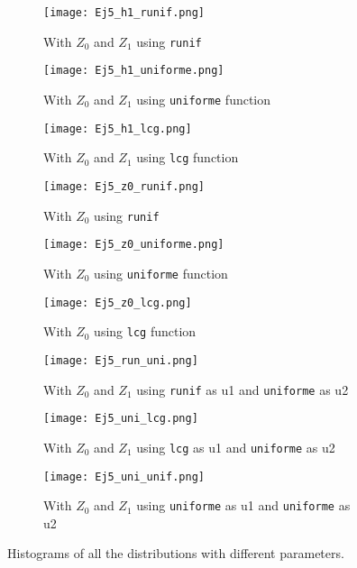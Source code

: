 \documentclass{article}
\begin{document}
\begin{figure}[]
\begin{subfigure}{.33\textwidth}
  \centering
  \texttt{[image: Ej5\_h1\_runif.png]}  
  \caption{With $Z_0$ and $Z_1$ using \texttt{runif}}
  \label{subfig5-1}
\end{subfigure}
\begin{subfigure}{.33\textwidth}
  \centering
  \texttt{[image: Ej5\_h1\_uniforme.png]}  
  \caption{With $Z_0$ and $Z_1$ using \texttt{uniforme} function}
  \label{subfig5-2}
\end{subfigure}
\begin{subfigure}{.33\textwidth}
  \centering
  \texttt{[image: Ej5\_h1\_lcg.png]}  
  \caption{ With $Z_0$ and $Z_1$ using \texttt{lcg} function}
  \label{subfig5-3}
\end{subfigure}
\newline
\begin{subfigure}{.33\textwidth}
  \centering
  \texttt{[image: Ej5\_z0\_runif.png]}  
  \caption{With $Z_0$ using \texttt{runif}}
  \label{subfig5-4}
\end{subfigure}
\begin{subfigure}{.33\textwidth}
  \centering
  \texttt{[image: Ej5\_z0\_uniforme.png]}  
  \caption{With $Z_0$ using \texttt{uniforme} function}
  \label{subfig5-5}
\end{subfigure}
\begin{subfigure}{.33\textwidth}
  \centering
  \texttt{[image: Ej5\_z0\_lcg.png]}  
  \caption{With $Z_0$ using \texttt{lcg} function}
  \label{subfig5-6}
\end{subfigure}
\newline
\begin{subfigure}{.33\textwidth}
  \centering
  \texttt{[image: Ej5\_run\_uni.png]}  
  \caption{With $Z_0$ and $Z_1$ using \texttt{runif} as u1 and \texttt{uniforme} as u2}
  \label{subfig5-7}
\end{subfigure}
\begin{subfigure}{.33\textwidth}
  \centering
  \texttt{[image: Ej5\_uni\_lcg.png]}  
  \caption{With $Z_0$ and $Z_1$ using \texttt{lcg} as u1 and \texttt{uniforme} as u2}
  \label{subfig5-8}
\end{subfigure}
\begin{subfigure}{.33\textwidth}
  \centering
  \texttt{[image: Ej5\_uni\_unif.png]}  
  \caption{With $Z_0$ and $Z_1$ using \texttt{uniforme} as u1 and \texttt{uniforme} as u2}
  \label{subfig5-9}
\end{subfigure}
\caption{Histograms of all the distributions with different parameters.  }
\label{fig5}
\end{figure}
\end{document}
